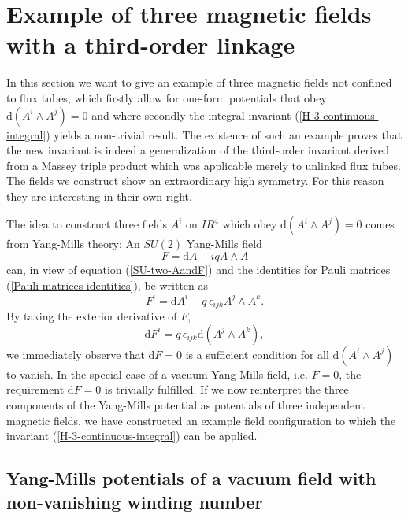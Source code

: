 \documentclass[10pt]{iopart}
\def \d{\mbox{d}}
\def \reals{I\!\!R}
\def \Eq{equation }
\def \indi{i}
\def \indj{j}
\def \indk{k}
\begin{document}
\section{Example of three magnetic fields with a 
third-order linkage}

In this section we want to give an example of three
magnetic fields not confined to flux tubes,
which firstly allow for one-form potentials that obey 
$\d(A^i \wedge A^j)=0$ and where secondly the integral invariant
(\ref{H-3-continuous-integral}) yields a non-trivial result. 
The existence of such an example proves that 
the new invariant is indeed a
generalization of the third-order invariant derived from a
Massey triple product which was applicable 
merely to unlinked flux tubes.
The fields we construct show an extraordinary high symmetry. For
this reason they are interesting in their own right.


The idea to construct three fields $A^i$ on $\reals^4$
which obey $\d(A^i \wedge A^j)=0$ comes from Yang-Mills theory:
An $SU(2)$ Yang-Mills field
\begin{equation}
   F = \d A - iq A \wedge A
\end{equation}
can, in view of \Eq (\ref{SU-two-AandF}) and
the identities for Pauli matrices (\ref{Pauli-matrices-identities}),
be written as
\begin{equation}
   F^\indi = \d A^\indi + q\,\epsilon_{\indi\indj\indk}A^\indj\wedge
   A^\indk. \label{F-alpha-vanishes}
\end{equation}
By taking the exterior derivative of $F$,
\begin{equation}
   \d F^\indi = q\,\epsilon_{\indi\indj\indk}\d(A^\indj\wedge A^\indk),
   \label{dF-su2}
\end{equation}
we immediately observe that $\d F=0$ is a sufficient condition for 
all $\d(A^\indi \wedge A^\indj)$ to vanish.
In the special case of a vacuum Yang-Mills field, i.e. $F=0$, the
requirement $\d F=0$ is trivially fulfilled.
If we now reinterpret the three components of the Yang-Mills potential
as potentials of three independent
magnetic fields, we have constructed an example field configuration to
which the invariant (\ref{H-3-continuous-integral}) can be 
applied.







\subsection{Yang-Mills potentials of a vacuum field with non-vanishing
  winding number}
\end{document}
